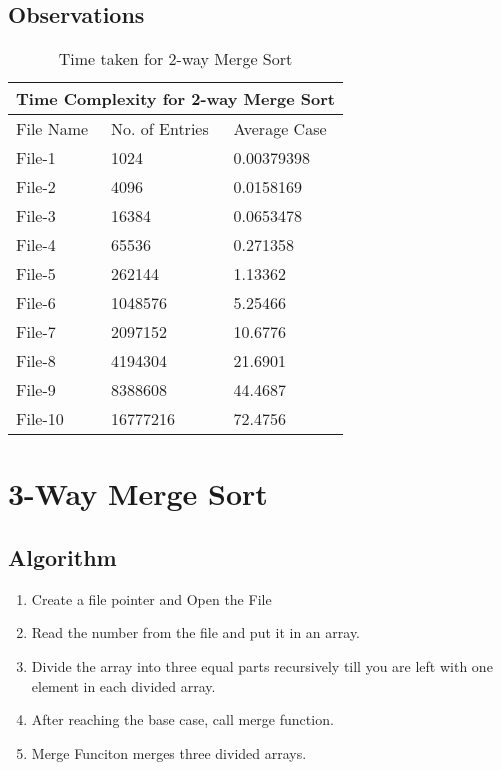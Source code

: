\documentclass{article}
\begin{document}
   \subsection{Observations}
   \begin{table}[h!] 
   \centering     
   \begin{tabular}{ | p{3cm} | p{3cm} | p{3cm} | }  
    \hline
    \multicolumn{3}{|c|}{Time Complexity for 2-way Merge Sort} \\
    \hline
    File Name & No. of Entries & Average Case\\
    \hline 
    File-1 & 1024 & 0.00379398 \\
    File-2 & 4096 & 0.0158169 \\ 
    File-3 & 16384 & 0.0653478 \\ 
    File-4 & 65536 & 0.271358 \\ 
    File-5 & 262144 & 1.13362 \\ 
    File-6 & 1048576 & 5.25466 \\ 
    File-7 & 2097152 & 10.6776 \\ 
    File-8 & 4194304 & 21.6901 \\ 
    File-9 & 8388608 & 44.4687 \\
    File-10 & 16777216 & 72.4756 \\  [1ex]
    \hline
   \end{tabular}
   \caption{Time taken for 2-way Merge Sort}
\end{table}

\section{3-Way Merge Sort}
\subsection{Algorithm}
\begin{enumerate}
 \item Create a file pointer and Open the File
 \item Read the number from the file and put it in an array.
 \item Divide the array into three equal parts recursively till you are left with one element in each divided array.
 \item After reaching the base case, call merge function.
 \item Merge Funciton merges three divided arrays.
\end{enumerate}
\end{document}
